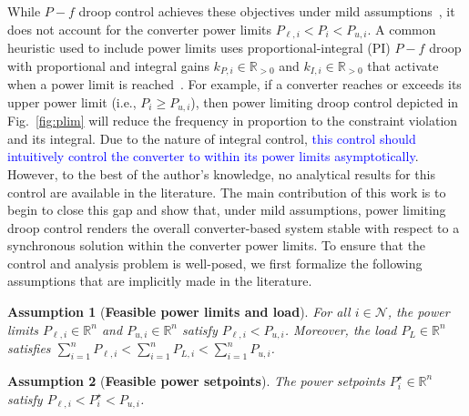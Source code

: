 \documentclass[twocolumn,twoside,journal]{IEEEtran}
\newtheorem{assumption}{Assumption}
\begin{document}
While $P-f$ droop control achieves these objectives under mild assumptions~\cite{SDB2013, SOA2014}, it does not account for the converter power limits $P_{\ell,i} < P_i < P_{u,i}$. A common heuristic used to include power limits uses proportional-integral (PI) $P-f$ droop with proportional and integral gains $k_{P,i} \in \mathbb{R}_{>0}$ and $k_{I,i} \in \mathbb{R}_{>0}$ that activate when a power limit is reached~\cite[Fig.~4]{DLK2019}. For example, if a converter reaches or exceeds its upper power limit (i.e., $P_i \geq P_{u,i}$), then power limiting droop control depicted in Fig.~\ref{fig:plim} will reduce the frequency in proportion to the constraint violation and its integral. Due to the nature of integral control, \textcolor{blue}{this control should intuitively control the converter to within its power limits asymptotically}. However, to the best of the author's knowledge, no analytical results for this control are available in the literature. The main contribution of this work is to begin to close this gap and show that, under mild assumptions, power limiting droop control renders the overall converter-based system stable with respect to a synchronous solution within the converter power limits. To ensure that the control and analysis problem is well-posed, we first formalize the following assumptions that are implicitly made in the literature.

\begin{assumption}[\textbf{Feasible power limits and load}]\label{assum:feas}
    For all $i \in \mathcal{N}$, the power limits $P_{\ell,i} \in \mathbb{R}^n$ and $P_{u,i} \in \mathbb{R}^n$ satisfy $P_{\ell,i} < P_{u,i}$. Moreover, the load $P_L \in \mathbb{R}^n$ satisfies $\sum_{i=1}^n P_{\ell,i} < \sum_{i=1}^n  P_{L,i} < \sum_{i=1}^n P_{u,i}$.
\end{assumption}
%
\begin{assumption}[\textbf{Feasible power setpoints}]\label{assum:setpoint}
    The power setpoints $P^\star_i \in \mathbb{R}^n$ satisfy $P_{\ell,i} < P^\star_i < P_{u,i}$.
\end{assumption}
%
\end{document}
